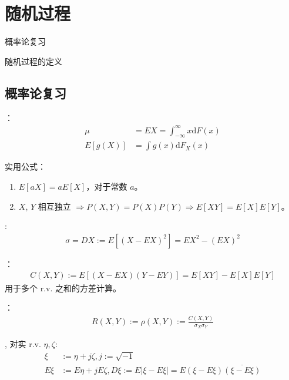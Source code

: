\chapter{随机过程}
\label{chap:stochastic_processes}


\begin{learningobjectives}
	\item 概率论复习
	\item 随机过程的定义
\end{learningobjectives}


\section{概率论复习}
：
\begin{align*}
	\mu &= EX = \int_{-\infty}^\infty x \mathrm{d} F(x) \\
	E[g(X)] &= \int g(x) \mathrm{d} F_X(x)
\end{align*}


实用公式：
\begin{enumerate}
	\item $E[aX] = aE[X]$，对于常数 $a$。
	\item $X$, $Y$ 相互独立 $\Rightarrow P(X, Y) = P(X) P(Y) \Rightarrow E[XY] = E[X]E[Y]$。
\end{enumerate}

:
\begin{align*}
	\sigma = DX := E[(X - EX)^2] = EX^2 - (EX)^2
\end{align*}

：
\begin{align*}
	C(X, Y) := E[(X - EX)(Y - EY)] = E[XY] - E[X]E[Y]
\end{align*}
用于多个 r.v. 之和的方差计算。

：
\begin{align*}
	R(X,Y) := \rho(X,Y):=\frac{C(X,Y)}{\sigma_X \sigma_Y}
\end{align*}

, 对实 r.v. $\eta, \zeta$:
\begin{align*}
	\xi &:= \eta + j \zeta, j := \sqrt{-1} \\
	E\xi &:= E\eta + j E\zeta, D\xi := E|\xi - E\xi| = E(\xi - E\xi)\overline{(\xi - E\xi)}
\end{align*}

